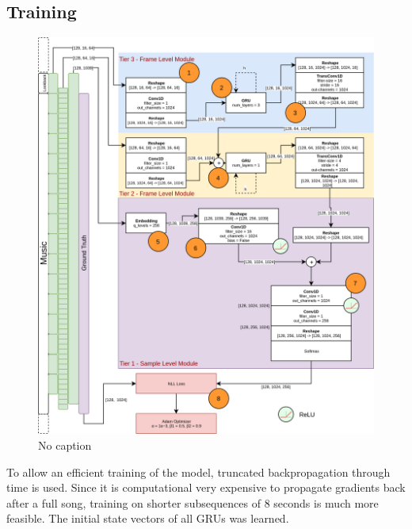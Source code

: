 \documentclass[12pt]{article}
\begin{document}
\subsection{Training}

\begin{figure}[ht!]
    \includegraphics[width=\textwidth]{img/samplernn-arch.png}
    \caption{No caption} %
    \label{fig:samplernn-arch}
\end{figure}

To allow an efficient training of the model, truncated backpropagation through time is used.
Since it is computational very expensive to propagate gradients back after a full song, training on shorter subsequences of 8 seconds is much more feasible. %
The initial state vectors of all GRUs was learned.
\end{document}
